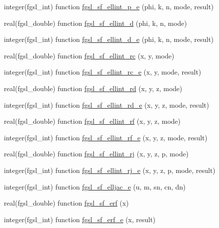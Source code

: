 \begin{DoxyCompactItemize}
\item 
integer(fgsl\-\_\-int) function \hyperlink{specfunc_8finc_ab23078451803edd7689b0e3ec28b4dff}{fgsl\-\_\-sf\-\_\-ellint\-\_\-p\-\_\-e} (phi, k, n, mode, result)
\item 
real(fgsl\-\_\-double) function \hyperlink{specfunc_8finc_acdff073e25dde9dce6119c2298f1c0bc}{fgsl\-\_\-sf\-\_\-ellint\-\_\-d} (phi, k, n, mode)
\item 
integer(fgsl\-\_\-int) function \hyperlink{specfunc_8finc_ae4fdb63820ab4747100940d56bdec2c7}{fgsl\-\_\-sf\-\_\-ellint\-\_\-d\-\_\-e} (phi, k, n, mode, result)
\item 
real(fgsl\-\_\-double) function \hyperlink{specfunc_8finc_a1d5f3ce316b48bf6ffb8982ca5057082}{fgsl\-\_\-sf\-\_\-ellint\-\_\-rc} (x, y, mode)
\item 
integer(fgsl\-\_\-int) function \hyperlink{specfunc_8finc_a719664cd13b3a41176c83a57444bc4f5}{fgsl\-\_\-sf\-\_\-ellint\-\_\-rc\-\_\-e} (x, y, mode, result)
\item 
real(fgsl\-\_\-double) function \hyperlink{specfunc_8finc_a96ae786ccf6f90310994e69eee97b77c}{fgsl\-\_\-sf\-\_\-ellint\-\_\-rd} (x, y, z, mode)
\item 
integer(fgsl\-\_\-int) function \hyperlink{specfunc_8finc_a8084cb09e7e835c687eb9c2a5cad7ca3}{fgsl\-\_\-sf\-\_\-ellint\-\_\-rd\-\_\-e} (x, y, z, mode, result)
\item 
real(fgsl\-\_\-double) function \hyperlink{specfunc_8finc_aa707e789919facfc58a92e5a08ca2de2}{fgsl\-\_\-sf\-\_\-ellint\-\_\-rf} (x, y, z, mode)
\item 
integer(fgsl\-\_\-int) function \hyperlink{specfunc_8finc_a5e71262e6008d0136c89240b94fc7380}{fgsl\-\_\-sf\-\_\-ellint\-\_\-rf\-\_\-e} (x, y, z, mode, result)
\item 
real(fgsl\-\_\-double) function \hyperlink{specfunc_8finc_a7fc2447a6251348ae8b394cfae4e08f5}{fgsl\-\_\-sf\-\_\-ellint\-\_\-rj} (x, y, z, p, mode)
\item 
integer(fgsl\-\_\-int) function \hyperlink{specfunc_8finc_a1937bf929872bcfaf8486f0e5b2886fc}{fgsl\-\_\-sf\-\_\-ellint\-\_\-rj\-\_\-e} (x, y, z, p, mode, result)
\item 
integer(fgsl\-\_\-int) function \hyperlink{specfunc_8finc_a380d6346bd860573f6536a7e4879b650}{fgsl\-\_\-sf\-\_\-elljac\-\_\-e} (u, m, sn, cn, dn)
\item 
real(fgsl\-\_\-double) function \hyperlink{specfunc_8finc_ac6186ec7c1d34190b0b934c8081e04e4}{fgsl\-\_\-sf\-\_\-erf} (x)
\item 
integer(fgsl\-\_\-int) function \hyperlink{specfunc_8finc_ab802f6d2fa1b4c7397098ee78eb00ae8}{fgsl\-\_\-sf\-\_\-erf\-\_\-e} (x, result)

\end{DoxyCompactItemize}
